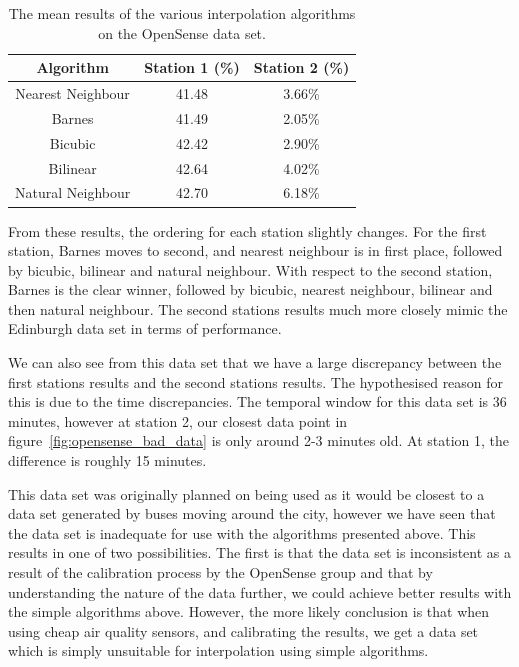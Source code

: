 			\begin{table}
				\centering
	    		\begin{tabular}{|c|c|c|}
	    			\hline
					Algorithm & Station 1 (\%) & Station 2 (\%) \\ \hline
					Nearest Neighbour & 41.48 & 3.66\% \\
					Barnes & 41.49 & 2.05\% \\
					Bicubic & 42.42 & 2.90\% \\
					Bilinear & 42.64 & 4.02\% \\
					Natural Neighbour & 42.70 & 6.18\% \\
					\hline
				\end{tabular}
				\caption{The mean results of the various interpolation algorithms on the OpenSense data set.}
				\label{tab:opensense_interpolation_split}
			\end{table} 

			From these results, the ordering for each station slightly changes. For the first station, Barnes moves to second, and nearest neighbour is in first place, followed by bicubic, bilinear and natural neighbour. With respect to the second station, Barnes is the clear winner, followed by bicubic, nearest neighbour, bilinear and then natural neighbour. The second stations results much more closely mimic the Edinburgh data set in terms of performance. 

			We can also see from this data set that we have a large discrepancy between the first stations results and the second stations results. The hypothesised reason for this is due to the time discrepancies. The temporal window for this data set is 36 minutes, however at station 2, our closest data point in figure~\ref{fig:opensense_bad_data} is only around 2-3 minutes old. At station 1, the difference is roughly 15 minutes. 

			This data set was originally planned on being used as it would be closest to a data set generated by buses moving around the city, however we have seen that the data set is inadequate for use with the algorithms presented above. This results in one of two possibilities. The first is that the data set is inconsistent as a result of the calibration process by the OpenSense group and that by understanding the nature of the data further, we could achieve better results with the simple algorithms above. However, the more likely conclusion is that when using cheap air quality sensors, and calibrating the results, we get a data set which is simply unsuitable for interpolation using simple algorithms. 

